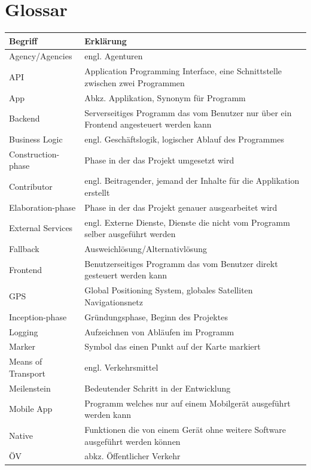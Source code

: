 \documentclass[a4paper,10pt,xetex]{article}
\begin{document}
\section{Glossar}\label{glossar}
\begin{longtabu} to \textwidth { | l | X[l] | }
\hline
\textbf{Begriff} & \textbf{Erklärung}\\\hline
\endhead

Agency/Agencies & engl. Agenturen\\\hline
API & Application Programming Interface, eine Schnittstelle zwischen zwei Programmen\\\hline
App & Abkz. Applikation, Synonym für Programm\\\hline
Backend & Serverseitiges Programm das vom Benutzer nur über ein Frontend angesteuert werden kann\\\hline
Business Logic & engl. Geschäftslogik, logischer Ablauf des Programmes\\\hline
Construction-phase & Phase in der das Projekt umgesetzt wird\\\hline
Contributor & engl. Beitragender, jemand der Inhalte für die Applikation erstellt\\\hline
Elaboration-phase & Phase in der das Projekt genauer ausgearbeitet wird\\\hline
External Services & engl. Externe Dienste, Dienste die nicht vom Programm selber ausgeführt werden\\\hline
Fallback & Ausweichlösung/Alternativlösung\\\hline
Frontend & Benutzerseitiges Programm das vom Benutzer direkt gesteuert werden kann\\\hline
GPS & Global Positioning System, globales Satelliten Navigationsnetz\\\hline
Inception-phase & Gründungsphase, Beginn des Projektes\\\hline
Logging & Aufzeichnen von Abläufen im Programm\\\hline
Marker & Symbol das einen Punkt auf der Karte markiert\\\hline
Means of Transport & engl. Verkehrsmittel\\\hline
Meilenstein & Bedeutender Schritt in der Entwicklung\\\hline
Mobile App & Programm welches nur auf einem Mobilgerät ausgeführt werden kann\\\hline
Native & Funktionen die von einem Gerät ohne weitere Software ausgeführt werden können\\\hline
ÖV & abkz. Öffentlicher Verkehr\\\hline

\end{longtabu}
\end{document}

